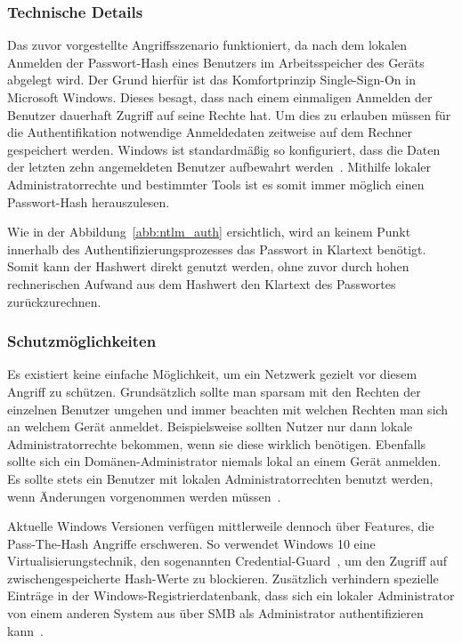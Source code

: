 \documentclass{AIFB_ITI_Crypto_Seminar}
\begin{document}
\subsubsection{Technische Details}
Das zuvor vorgestellte Angriffsszenario funktioniert, da nach dem lokalen Anmelden der Passwort-Hash eines Benutzers im Arbeitsspeicher des Geräts abgelegt wird. Der Grund hierfür ist das Komfortprinzip Single-Sign-On in Microsoft Windows. Dieses besagt, dass nach einem einmaligen Anmelden der Benutzer dauerhaft Zugriff auf seine Rechte hat. Um dies zu erlauben müssen für die Authentifikation notwendige Anmeldedaten zeitweise auf dem Rechner gespeichert werden. Windows ist standardmäßig so konfiguriert, dass die Daten der letzten zehn angemeldeten Benutzer aufbewahrt werden~\cite{pth}. Mithilfe lokaler Administratorrechte und bestimmter Tools ist es somit immer möglich einen Passwort-Hash herauszulesen. 

Wie in der Abbildung~\ref{abb:ntlm_auth} ersichtlich, wird an keinem Punkt innerhalb des Authentifizierungsprozesses das Passwort in Klartext benötigt. Somit kann der Hashwert direkt genutzt werden, ohne zuvor durch hohen rechnerischen Aufwand aus dem Hashwert den Klartext des Passwortes zurückzurechnen.

\subsubsection{Schutzmöglichkeiten}
Es existiert keine einfache Möglichkeit, um ein Netzwerk gezielt vor diesem Angriff zu schützen. Grundsätzlich sollte man sparsam mit den Rechten der einzelnen Benutzer umgehen und immer beachten mit welchen Rechten man sich an welchem Gerät anmeldet. Beispielsweise sollten Nutzer nur dann lokale Administratorrechte bekommen, wenn sie diese wirklich benötigen. Ebenfalls sollte sich ein Domänen-Administrator niemals lokal an einem Gerät anmelden. Es sollte stets ein Benutzer mit lokalen Administratorrechten benutzt werden, wenn Änderungen vorgenommen werden müssen~\cite{pth}. \par
Aktuelle Windows Versionen verfügen mittlerweile dennoch über Features, die Pass-The-Hash Angriffe erschweren. So verwendet Windows 10 eine Virtualisierungstechnik, den sogenannten Credential-Guard~\cite{pth_guard}, um den Zugriff auf zwischengespeicherte Hash-Werte zu blockieren. Zusätzlich verhindern spezielle Einträge in der Windows-Registrierdatenbank, dass sich ein lokaler Administrator von einem anderen System aus über SMB als Administrator authentifizieren kann~\cite{pth_schutz}.
\end{document}
